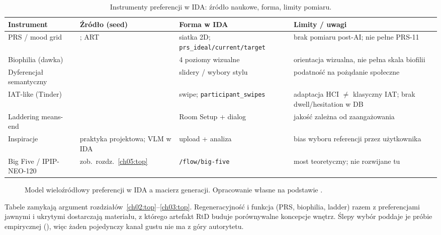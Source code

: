 \begin{table}[htbp]
  \centering
  \caption{Instrumenty preferencji w IDA: źródło naukowe, forma, limity pomiaru.}
  \label{tab:ch03:instruments}
  \begin{tabular}{@{}p{}p{}p{}p{}@{}}
    \toprule
    Instrument & Źródło (seed) & Forma w IDA & Limity / uwagi \\
    \midrule
    PRS / mood grid
      & \textcite{hartig1997prs}; ART \parencite{kaplan1995restorative}
      & siatka 2D; \texttt{prs\_ideal/current/target}
      & brak pomiaru post-AI; nie pełne PRS-11 \\
    Biophilia (dawka)
      & \textcite{kellert2008biophilic}
      & 4 poziomy wizualne
      & orientacja wizualna, nie pełna skala biofilii \\
    Dyferencjał semantyczny
      & \textcite{osgood1957measurement}
      & slidery / wybory stylu
      & podatność na pożądanie społeczne \\
    IAT-like (Tinder)
      & \textcite{greenwald1998iat}
      & swipe; \texttt{participant\_swipes}
      & adaptacja HCI $\neq$ klasyczny IAT; brak dwell/hesitation w DB \\
    Laddering means-end
      & \textcite{reynolds1988laddering}
      & Room Setup + dialog
      & jakość zależna od zaangażowania \\
    Inspiracje
      & praktyka projektowa; VLM w IDA \parencite{idaPlatform2026}
      & upload + analiza
      & bias wyboru referencji przez użytkownika \\
    Big Five / IPIP-NEO-120
      & zob.\ rozdz.~\ref{ch05:top}
      & \texttt{/flow/big-five}
      & most teoretyczny; nie rozwijane tu \\
    \bottomrule
  \end{tabular}
\end{table}

\begin{figure}[htbp]
  \centering
  \caption{Model wieloźródłowy preferencji w IDA a macierz generacji.
    Opracowanie własne na podstawie \parencite{idaPlatform2026}.}
  \label{fig:ch03:multisource}
\end{figure}

Tabele zamykają argument rozdziałów~\ref{ch02:top}--\ref{ch03:top}. Regeneracyjność i funkcja (PRS, biophilia, ladder) razem z preferencjami jawnymi i ukrytymi dostarczają materiału, z którego artefakt RtD buduje porównywalne koncepcje wnętrz. Ślepy wybór poddaje je próbie empirycznej (), więc żaden pojedynczy kanał gustu nie ma z góry autorytetu.
